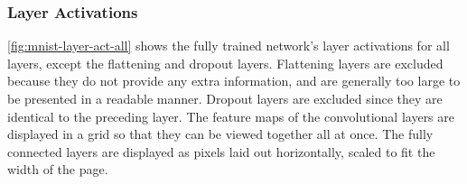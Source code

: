 \subsubsection{Layer Activations}

\autoref{fig:mnist-layer-act-all} shows the fully trained network's layer activations for all layers, except the flattening and dropout layers. Flattening layers are excluded because they do not provide any extra information, and are generally too large to be presented in a readable manner. Dropout layers are excluded since they are identical to the preceding layer. The feature maps of the convolutional layers are displayed in a grid so that they can be viewed together all at once. The fully connected layers are displayed as pixels laid out horizontally, scaled to fit the width of the page. \\

